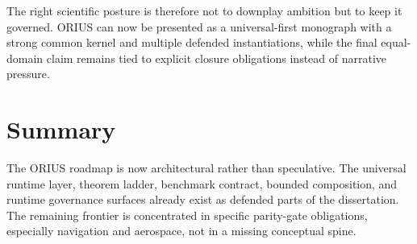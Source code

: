 The right scientific posture is therefore not to downplay ambition but to keep
it governed. ORIUS can now be presented as a universal-first monograph with a
strong common kernel and multiple defended instantiations, while the final
equal-domain claim remains tied to explicit closure obligations instead of
narrative pressure.

\section{Summary}

The ORIUS roadmap is now architectural rather than speculative. The universal
runtime layer, theorem ladder, benchmark contract, bounded composition, and
runtime governance surfaces already exist as defended parts of the dissertation.
The remaining frontier is concentrated in specific parity-gate obligations,
especially navigation and aerospace, not in a missing conceptual spine.
